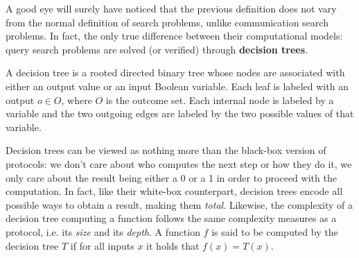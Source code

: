 A good eye will surely have noticed that the previous definition does not vary from the normal definition of search problems, unlike communication search problems. In fact, the only true difference between their computational models: query search problems are solved (or verified) through \textbf{decision trees}.

\begin{definition}
    A decision tree is a rooted directed binary tree whose nodes are associated with either an output value or an input Boolean variable. Each leaf is labeled with an output $o \in O$, where $O$ is the outcome set. Each internal node is labeled by a variable and the two outgoing edges are labeled by the two possible values of that variable.
\end{definition}

Decision trees can be viewed as nothing more than the black-box version of protocols: we don't care about who computes the next step or how they do it, we only care about the result being either a 0 or a 1 in order to proceed with the computation. In fact, like their white-box counterpart, decision trees encode all possible ways to obtain a result, making them \textit{total}. Likewise, the complexity of a decision tree computing a function follows the same complexity measures as a protocol, i.e. its \textit{size} and its \textit{depth}. A function $f$ is said to be computed by the decision tree $T$ if for all inputs $x$ it holds that $f(x) = T(x)$. 

